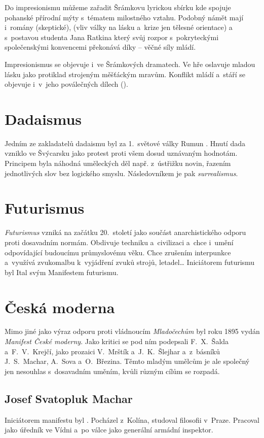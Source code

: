 Do impresionismu můžeme zařadit Šrámkovu lyrickou sbírku 
kde spojuje pohanské přírodní mýty s~tématem milostného vztahu. Podobný
námět mají i~romány  (skeptické),  (vliv
války na lásku a~krize jen tělesné orientace) a~
s~postavou studenta Jana Ratkina který svůj rozpor s~pokryteckými
společenskými konvencemi překonává díky  -- věčné síly
mládí.

Impresionismus se objevuje i~ve Šrámkových dramatech. Ve hře 
oslavuje mladou lásku jako protiklad strojeným měšťáckým mravům.
Konflikt mládí a~stáří se objevuje i~v~jeho poválečných dílech ().

\section{Dadaismus}
Jedním ze zakladatelů dadaismu byl za 1.~světové války Rumun
. Hnutí dada vzniklo ve Švýcarsku jako protest
proti všem dosud uznávaným hodnotám. Principem byla náhodná 
uměleckých děl např. z~ústřižku novin, řazením jednotlivých slov bez
logického smyslu. Následovníkem je pak \emph{surrealismus}.

\section{Futurismus}
\emph{Futurismus} vzniká na začátku 20.~století jako součást anarchistického
odporu proti dosavadním normám. Obdivuje techniku a~civilizaci a~chce
i~umění odpovídající budoucímu průmyslovému věku. Chce 
zrušením interpunkce a~využívá zvukomalbu k~vyjádření zvuků strojů,
letadel\dots{} Iniciátorem futurismu byl Ital 
svým Manifestem futurismu.

\section{Česká moderna} 
Mimo jiné jako výraz odporu proti vládnoucím \emph{Mladočechům} byl roku
1895 vydán \emph{Manifest České moderny}. Jako kritici se pod ním
podepsali F.~X.~Šalda a~F.~V.~Krejčí, jako prozaici V.~Mrštík
a~J.~K.~Šlejhar a~z~básníků J.~S.~Machar, A.~Sova a~O.~Březina. Těmto
mladým umělcům je ale společný jen nesouhlas s~dosavadním uměním, kvůli
různým cílům se rozpadá.

\subsection*{Josef Svatopluk Machar}
Iniciátorem manifestu byl . Pocházel
z~Kolína, studoval filosofii v~Praze. Pracoval jako úředník ve Vídni
a~po válce jako generální armádní inspektor.

